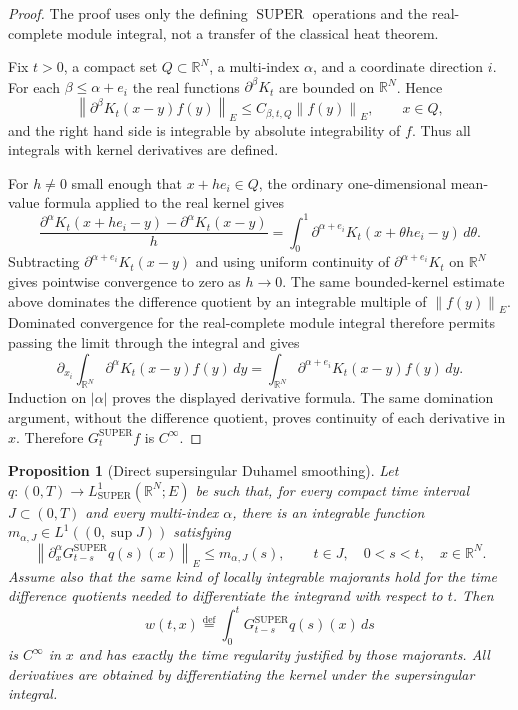 \documentclass{amsart}
\newtheorem{prop}{Proposition}
\DeclareMathOperator{\SUPER}{SUPER}
\newcommand{\eqdef}{\overset{\mathrm{def}}{=}}
\newcommand{\norm}[1]{\left\lVert #1\right\rVert}
\newcommand{\abs}[1]{\left\lvert #1\right\rvert}
\begin{document}
\begin{proof}
The proof uses only the defining $\SUPER$ operations and the real-complete
module integral, not a transfer of the classical heat theorem.

Fix $t>0$, a compact set $Q\subset\mathbb{R}^N$, a multi-index
$\alpha$, and a coordinate direction $i$.  For each
$\beta\leq\alpha+e_i$ the real functions $\partial^\beta K_t$ are bounded on
$\mathbb{R}^N$.  Hence
\[
  \norm{\partial^\beta K_t(x-y)f(y)}_E
  \leq C_{\beta,t,Q}\norm{f(y)}_E,
  \qquad x\in Q ,
\]
and the right hand side is integrable by absolute integrability of $f$.
Thus all integrals with kernel derivatives are defined.

For $h\neq0$ small enough that $x+he_i\in Q$, the ordinary one-dimensional
mean-value formula applied to the real kernel gives
\[
  \frac{\partial^\alpha K_t(x+he_i-y)-\partial^\alpha K_t(x-y)}{h}
  =
  \int_0^1
  \partial^{\alpha+e_i}K_t(x+\theta he_i-y)\,d\theta .
\]
Subtracting $\partial^{\alpha+e_i}K_t(x-y)$ and using uniform continuity of
$\partial^{\alpha+e_i}K_t$ on $\mathbb{R}^N$ gives pointwise
convergence to zero as $h\to0$.  The same bounded-kernel estimate above
dominates the difference quotient by an integrable multiple of
$\norm{f(y)}_E$.  Dominated convergence for the real-complete module integral
therefore permits passing the limit through the integral and gives
\[
  \partial_{x_i}\int_{\mathbb{R}^N}\partial^\alpha K_t(x-y)f(y)\,dy
  =
  \int_{\mathbb{R}^N}\partial^{\alpha+e_i}K_t(x-y)f(y)\,dy .
\]
Induction on $\abs{\alpha}$ proves the displayed derivative formula.  The
same domination argument, without the difference quotient, proves continuity
of each derivative in $x$.  Therefore $G_t^{\SUPER}f$ is $C^\infty$.
\end{proof}

\begin{prop}[Direct supersingular Duhamel smoothing]\label{prop:super-duhamel-smoothing}
Let $q:(0,T)\to L^1_{\SUPER}(\mathbb{R}^N;E)$ be such that, for every compact
time interval $J\subset(0,T)$ and every multi-index $\alpha$, there is an
integrable function $m_{\alpha,J}\in L^1((0,\sup J))$ satisfying
\[
  \norm{\partial_x^\alpha G_{t-s}^{\SUPER}q(s)(x)}_E
  \leq m_{\alpha,J}(s),
  \qquad t\in J,\quad 0<s<t,\quad x\in\mathbb{R}^N .
\]
Assume also that the same kind of locally integrable majorants hold for the
time difference quotients needed to differentiate the integrand with respect
to $t$.  Then
\[
  w(t,x)\eqdef\int_0^tG_{t-s}^{\SUPER}q(s)(x)\,ds
\]
is $C^\infty$ in $x$ and has exactly the time regularity justified by those
majorants.  All derivatives are obtained by differentiating the kernel under
the supersingular integral.
\end{prop}
\end{document}

